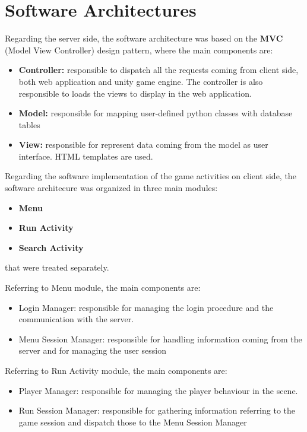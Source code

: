 	
	\section{Software Architectures}
	Regarding the server side, the software architecture was based on the \textbf{MVC} (Model View Controller) design pattern, where the main components are:
	\begin{itemize}
		\item \textbf{Controller:} responsible to dispatch all the requests coming from client side, both web application and unity game engine. The controller is also responsible to loads the views to display in the web application.
		\item \textbf{Model:} responsible for mapping user-defined python classes with database tables
		\item \textbf{View:} responsible for represent data coming from the model as user interface. HTML templates are used.
	\end{itemize}

	\noindent
	Regarding the software implementation of the game activities on client side, the software architecure was organized in three main modules:
	\begin{itemize}
		\item \textbf{Menu}
		\item \textbf{Run Activity}
		\item \textbf{Search Activity}
	\end{itemize}
	\noindent
	 that were treated separately. \newline
	 
	 Referring to Menu module, the main components are:
	 \begin{itemize}
	 	\item {Login Manager:} responsible for managing the login procedure and the communication with the server.
	 	\item {Menu Session Manager:} responsible for handling information coming from the server and for managing the user session
	 \end{itemize}
 
 	Referring to Run Activity module, the main components are:
 	\begin{itemize}
 		\item {Player Manager:} responsible for managing the player behaviour in the scene.
 		\item {Run Session Manager:} responsible for gathering information referring to the game session and dispatch those to the Menu Session Manager
 	\end{itemize}
 
